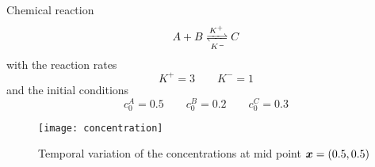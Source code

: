\documentclass[a4paper,DIV=12,10pt]{scrartcl}
\newcommand{\x}[0]{\vek{x}}
\begin{document}
Chemical reaction
\begin{equation}
  \label{eq:react}
  A + B \xrightleftharpoons[K^-]{K^+}   C
\end{equation}
with the reaction rates
\begin{equation}
  \label{eq:rates}
  K^+ = 3 \qquad K^- = 1
\end{equation}
and the initial conditions
\begin{equation}
  \label{eq:initalConc}
  c^A_0 = 0.5 \qquad c^B_0 = 0.2 \qquad c^C_0 = 0.3
\end{equation}


\begin{figure}[htbp]
  \centering
  \texttt{[image: concentration]}
  \caption{Temporal variation of the concentrations at mid point $\x = (0.5,0.5)$}
  \label{fig:result}
\end{figure}



\end{document}
